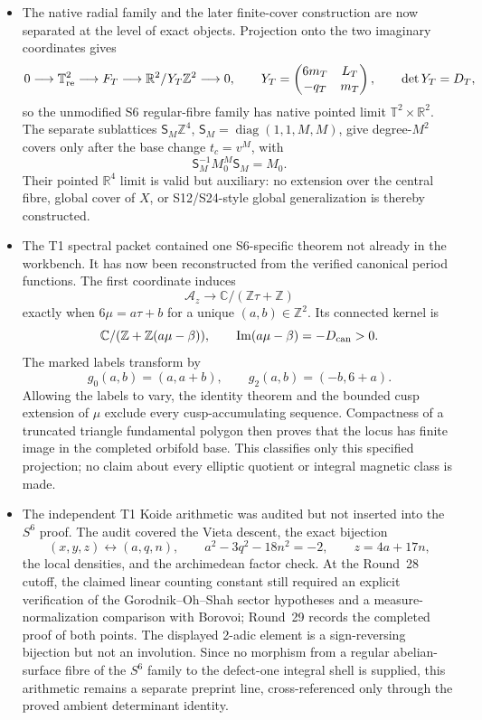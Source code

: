 \begin{itemize}[leftmargin=1.8em]
\item The native radial family and the later finite-cover construction are now
separated at the level of exact objects.  Projection onto the two imaginary
coordinates gives
\[
 0\longrightarrow\mathbb T^2_{\rm re}\longrightarrow F_T
 \longrightarrow\mathbb R^2/Y_T\mathbb Z^2\longrightarrow0,
 \qquad
 Y_T=\begin{pmatrix}6m_T&L_T\\-q_T&m_T\end{pmatrix},
 \qquad \det Y_T=D_T,
\]
so the unmodified S6 regular-fibre family has native pointed limit
\(\mathbb T^2\times\mathbb R^2\).  The separate sublattices
\(\mathsf S_M\mathbb Z^4\), \(\mathsf S_M=\operatorname{diag}(1,1,M,M)\),
give degree-\(M^2\) covers only after the base change \(t_c=v^M\), with
\[
 \mathsf S_M^{-1}M_0^M\mathsf S_M=M_0.
\]
Their pointed \(\mathbb R^4\) limit is valid but auxiliary: no extension over
the central fibre, global cover of \(X\), or S12/S24-style global
generalization is thereby constructed.

\item The T1 spectral packet contained one S6-specific theorem not already in
the workbench.  It has now been reconstructed from the verified canonical
period functions.  The first coordinate induces
\[
 \mathcal A_z\longrightarrow\mathbb C/(\mathbb Z\tau+\mathbb Z)
\]
exactly when \(6\mu=a\tau+b\) for a unique \((a,b)\in\mathbb Z^2\).  Its
connected kernel is
\[
 \mathbb C/(\mathbb Z+\mathbb Z(a\mu-\beta)),
 \qquad \operatorname{Im}(a\mu-\beta)=-D_{\rm can}>0.
\]
The marked labels transform by
\[
 g_0(a,b)=(a,a+b),\qquad g_2(a,b)=(-b,6+a).
\]
Allowing the labels to vary, the identity theorem and the bounded cusp
extension of \(\mu\) exclude every cusp-accumulating sequence.  Compactness
of a truncated triangle fundamental polygon then proves that the locus has
finite image in the completed orbifold base.  This classifies only this
specified projection; no claim about every elliptic quotient or integral
magnetic class is made.

\item The independent T1 Koide arithmetic was audited but not inserted into
the \(S^6\) proof.  The audit covered the Vieta descent, the exact bijection
\[
 (x,y,z)\longleftrightarrow(a,q,n),\qquad
 a^2-3q^2-18n^2=-2,\qquad z=4a+17n,
\]
the local densities, and the archimedean factor check.  At the Round~28
cutoff, the claimed linear counting constant still required an explicit
verification of the Gorodnik--Oh--Shah sector hypotheses and a
measure-normalization comparison with Borovoi; Round~29 records the completed
proof of both points.  The displayed 2-adic element is a sign-reversing
bijection but not an involution.  Since no morphism from a regular
abelian-surface fibre of the \(S^6\) family to
the defect-one integral shell is supplied, this arithmetic remains a separate
preprint line, cross-referenced only through the proved ambient determinant
identity.
\end{itemize}

